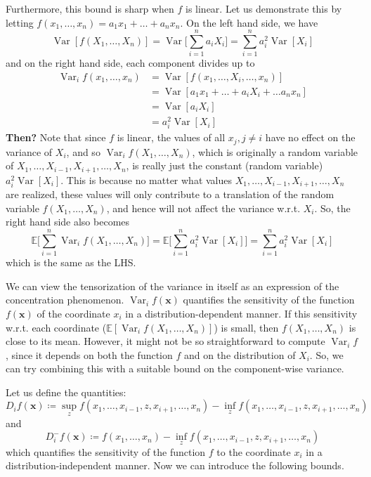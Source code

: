 \documentclass{article}
\DeclareMathOperator{\Var}{Var}
\theoremstyle{definition}
\theoremstyle{remark}
\theoremstyle{definition}
\begin{document}
  Furthermore, this bound is sharp when $f$ is linear. Let us demonstrate this by letting $f(x_1, \ldots, x_n) = a_1 x_1 + \ldots + a_n x_n$. On the left hand side, we have 
  \[\Var[ f(X_1, \ldots, X_n)] = \Var\bigg[ \sum_{i=1}^n a_i X_i \bigg] = \sum_{i=1}^n a_i^2 \Var[X_i] \]
  and on the right hand side, each component divides up to 
  \begin{align*}
      \Var_i f(x_1, \ldots, x_n ) & = \Var[ f(x_1, \ldots, X_i, \ldots, x_n)] \\
      & = \Var[ a_1 x_1 + \ldots + a_i X_i + \ldots a_n x_n] \\
      & = \Var[a_i X_i] \\
      & = a_i^2 \Var[X_i]
  \end{align*}
  \textbf{Then?} Note that since $f$ is linear, the values of all $x_j, j \neq i$ have no effect on the variance of $X_i$, and so $\Var_i f(X_1, \ldots, X_n)$, which is originally a random variable of $X_1, \ldots, X_{i-1}, X_{i+1}, \ldots, X_n$, is really just the constant (random variable) $a_i^2 \Var[X_i]$. This is because no matter what values $X_1, \ldots, X_{i-1}, X_{i+1}, \ldots, X_n$ are realized, these values will only contribute to a translation of the random variable $f(X_1, \ldots, X_n)$, and hence will not affect the variance w.r.t. $X_i$. So, the right hand side also becomes 
  \[\mathbb{E} \bigg[ \sum_{i=1}^n \Var_i f(X_1, \ldots, X_n) \bigg] = \mathbb{E} \bigg[ \sum_{i=1}^n a_i^2 \Var[X_i] \bigg] = \sum_{i=1}^n a_i^2 \Var[X_i]\]
  which is the same as the LHS. 

  We can view the tensorization of the variance in itself as an expression of the concentration phenomenon. $\Var_i f (\mathbf{x})$ quantifies the sensitivity of the function $f(\mathbf{x})$ of the coordinate $x_i$ in a distribution-dependent manner. If this sensitivity w.r.t. each coordinate ($\mathbb{E}[ \Var_i f(X_1, \ldots, X_n)]$) is small, then $f(X_1, \ldots, X_n)$ is close to its mean. However, it might not be so straightforward to compute $\Var_i f$, since it depends on both the function $f$ and on the distribution of $X_i$. So, we can try combining this with a suitable bound on the component-wise variance. 

  Let us define the quantities: 
  \[D_i f (\mathbf{x}) \coloneqq \sup_z f(x_1, \ldots, x_{i-1}, z, x_{i+1}, \ldots, x_n) - \inf_z f(x_1, \ldots, x_{i-1}, z, x_{i+1}, \ldots, x_n)\]
  and 
  \[D_i^- f(\mathbf{x}) \coloneqq f(x_1, \ldots, x_n) - \inf_z f(x_1, \ldots, x_{i-1}, z, x_{i+1}, \ldots, x_n)\]
  which quantifies the sensitivity of the function $f$ to the coordinate $x_i$ in a distribution-independent manner. Now we can introduce the following bounds. 
\end{document}
